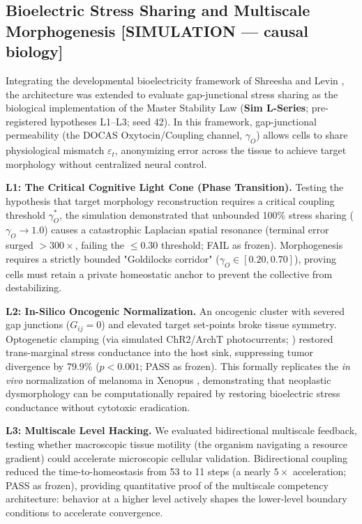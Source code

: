 \documentclass[11pt,twocolumn]{article}
\theoremstyle{plain}
\begin{document}
\subsection{Bioelectric Stress Sharing and Multiscale Morphogenesis [SIMULATION — causal biology]}

Integrating the developmental bioelectricity framework of Shreesha and Levin \citep{shreesha2024stress}, the architecture was extended to evaluate gap-junctional stress sharing as the biological implementation of the Master Stability Law (\textbf{Sim L-Series}; pre-registered hypotheses L1--L3; seed 42). In this framework, gap-junctional permeability (the DOCAS Oxytocin/Coupling channel, $\gamma_O$) allows cells to share physiological mismatch $\varepsilon_t$, anonymizing error across the tissue to achieve target morphology without centralized neural control.

\textbf{L1: The Critical Cognitive Light Cone (Phase Transition).} Testing the hypothesis that target morphology reconstruction requires a critical coupling threshold $\gamma_O^*$, the simulation demonstrated that unbounded 100\% stress sharing ($\gamma_O \to 1.0$) causes a catastrophic Laplacian spatial resonance (terminal error surged $>300\times$, failing the $\le 0.30$ threshold; FAIL as frozen). Morphogenesis requires a strictly bounded "Goldilocks corridor" ($\gamma_O \in [0.20, 0.70]$), proving cells must retain a private homeostatic anchor to prevent the collective from destabilizing.

\textbf{L2: In-Silico Oncogenic Normalization.} An oncogenic cluster with severed gap junctions ($G_{ij} = 0$) and elevated target set-points broke tissue symmetry. Optogenetic clamping (via simulated ChR2/ArchT photocurrents; \citealp{evans2016pyrho}) restored trans-marginal stress conductance into the host sink, suppressing tumor divergence by 79.9\% ($p < 0.001$; PASS as frozen). This formally replicates the \emph{in vivo} normalization of melanoma in Xenopus \citep{chernet2016long}, demonstrating that neoplastic dysmorphology can be computationally repaired by restoring bioelectric stress conductance without cytotoxic eradication.

\textbf{L3: Multiscale Level Hacking.} We evaluated bidirectional multiscale feedback, testing whether macroscopic tissue motility (the organism navigating a resource gradient) could accelerate microscopic cellular validation. Bidirectional coupling reduced the time-to-homeostasis from 53 to 11 steps (a nearly $5\times$ acceleration; PASS as frozen), providing quantitative proof of the multiscale competency architecture: behavior at a higher level actively shapes the lower-level boundary conditions to accelerate convergence.
\end{document}
